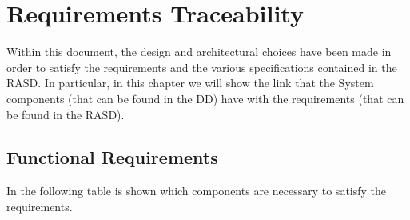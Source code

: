 \documentclass[a4paper, 12pt, oneside, table]{article}
\begin{document}
\newpage
\section{Requirements Traceability}
Within this document, the design and architectural choices have been made in order to satisfy the requirements and the various specifications contained in the RASD. In particular, in this chapter we will show the link that the System components (that can be found in the DD) have with the requirements (that can be found in the RASD).
\subsection{Functional Requirements}
In the following table is shown which components are necessary to satisfy the requirements.
\end{document}
